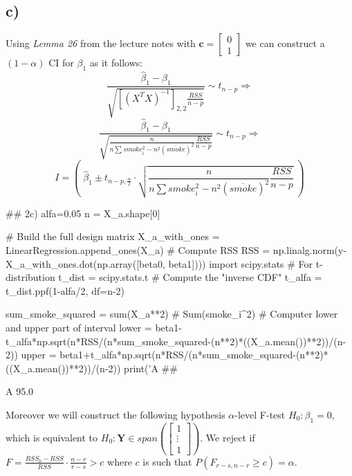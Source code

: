 \documentclass[a4paper]{article}
\begin{document}
\subsection{c)}
Using \textit{Lemma 26} from the lecture notes with $\textbf{c}=\begin{bmatrix}0\\1\end{bmatrix}$ we can construct a $(1-\alpha)$ CI for $\beta_{1}$ as it follows:
\begin{equation*}
\frac{\hat{\beta}_{1}-\beta_{1}}{\sqrt{[(X^TX)^{-1}]_{2,2}\frac{RSS}{n-p}}} \sim t_{n-p} \Rightarrow
\end{equation*}
\begin{equation*}
\frac{\hat{\beta}_{1}-\beta_{1}}{\sqrt{\frac{n}{n\sum{smoke_{i}^2}-n^2(\overline{smoke})^2}\frac{RSS}{n-p}}} \sim t_{n-p} \Rightarrow
\end{equation*}
\begin{equation*}
I = ( \; \hat{\beta}_{1} \pm t_{n-p,\frac{\alpha}{2}} \cdot \sqrt{\frac{n}{n\sum{smoke_{i}^2}-n^2(\overline{smoke})^2}\frac{RSS}{n-p}} \; )
\end{equation*}
\begin{python}
	## 2c)
	alfa=0.05
	n = X_a.shape[0]
	
	# Build the full design matrix
	X_a_with_ones = LinearRegression.append_ones(X_a)
	# Compute RSS
	RSS = np.linalg.norm(y-X_a_with_ones.dot(np.array([beta0, beta1])))
	import scipy.stats # For t-distribution
	t_dist = scipy.stats.t
	# Compute the "inverse CDF"
	t_alfa = t_dist.ppf(1-alfa/2, df=n-2) 
	
	sum_smoke_squared = sum(X_a**2) # Sum(smoke_i^2)
	# Computer lower and upper part of interval
	lower = beta1-t_alfa*np.sqrt(n*RSS/(n*sum_smoke_squared-(n**2)*((X_a.mean())**2))/(n-2))
	upper = beta1+t_alfa*np.sqrt(n*RSS/(n*sum_smoke_squared-(n**2)*((X_a.mean())**2))/(n-2))
	print('A {}%
	##
\end{python}
\begin{python}
	A 95.0%
\end{python}
Moreover we will construct the following hypothesis $\alpha$-level F-test \underline{$H_{0}:\beta_{1}=0$}, which is equivalent to $H_{0}: \textbf{Y} \in span(\begin{bmatrix} 1 \\ \vdots \\ 1 \end{bmatrix})$. We reject if $F=\frac{RSS_{0}-RSS}{RSS}\cdot\frac{n-r}{r-s}>c$ where $c$ is such that $P(F_{r-s,n-r} \geq c)=\alpha$. \\
\end{document}
